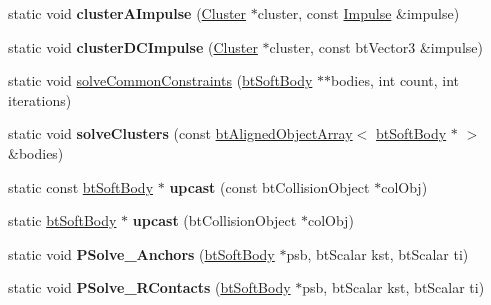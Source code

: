 \begin{DoxyCompactItemize}
\item 
\hypertarget{classbt_soft_body_affddc2d7f3b500c44d9e1f703df0cc33}{static void {\bfseries cluster\+A\+Impulse} (\hyperlink{structbt_soft_body_1_1_cluster}{Cluster} $\ast$cluster, const \hyperlink{structbt_soft_body_1_1_impulse}{Impulse} \&impulse)}\label{classbt_soft_body_affddc2d7f3b500c44d9e1f703df0cc33}

\item 
\hypertarget{classbt_soft_body_a7a988e2954fdf0f8f4691599ca645d9b}{static void {\bfseries cluster\+D\+C\+Impulse} (\hyperlink{structbt_soft_body_1_1_cluster}{Cluster} $\ast$cluster, const bt\+Vector3 \&impulse)}\label{classbt_soft_body_a7a988e2954fdf0f8f4691599ca645d9b}

\item 
static void \hyperlink{classbt_soft_body_ae8a2fc459b2afc985fbb03c1b0203bec}{solve\+Common\+Constraints} (\hyperlink{classbt_soft_body}{bt\+Soft\+Body} $\ast$$\ast$bodies, int count, int iterations)
\item 
\hypertarget{classbt_soft_body_aa4129fb3eb8bc03f50ce8b25b28b3842}{static void {\bfseries solve\+Clusters} (const \hyperlink{classbt_aligned_object_array}{bt\+Aligned\+Object\+Array}$<$ \hyperlink{classbt_soft_body}{bt\+Soft\+Body} $\ast$ $>$ \&bodies)}\label{classbt_soft_body_aa4129fb3eb8bc03f50ce8b25b28b3842}

\item 
\hypertarget{classbt_soft_body_ac6209b1843fd2511b477547c648adb67}{static const \hyperlink{classbt_soft_body}{bt\+Soft\+Body} $\ast$ {\bfseries upcast} (const bt\+Collision\+Object $\ast$col\+Obj)}\label{classbt_soft_body_ac6209b1843fd2511b477547c648adb67}

\item 
\hypertarget{classbt_soft_body_ab401977a2814ec48a984a2c0e5864939}{static \hyperlink{classbt_soft_body}{bt\+Soft\+Body} $\ast$ {\bfseries upcast} (bt\+Collision\+Object $\ast$col\+Obj)}\label{classbt_soft_body_ab401977a2814ec48a984a2c0e5864939}

\item 
\hypertarget{classbt_soft_body_a4958237e624f63ec359a10231a11a19a}{static void {\bfseries P\+Solve\+\_\+\+Anchors} (\hyperlink{classbt_soft_body}{bt\+Soft\+Body} $\ast$psb, bt\+Scalar kst, bt\+Scalar ti)}\label{classbt_soft_body_a4958237e624f63ec359a10231a11a19a}

\item 
\hypertarget{classbt_soft_body_aaafba18f5de9bc2d62a41b15fc0421bb}{static void {\bfseries P\+Solve\+\_\+\+R\+Contacts} (\hyperlink{classbt_soft_body}{bt\+Soft\+Body} $\ast$psb, bt\+Scalar kst, bt\+Scalar ti)}\label{classbt_soft_body_aaafba18f5de9bc2d62a41b15fc0421bb}


\end{DoxyCompactItemize}
